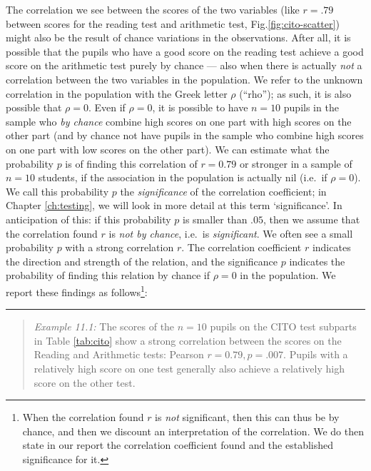 \documentclass[
]{book}
\begin{document}
The correlation we see between the scores of the two variables (like
\(r=.79\) between scores for the reading test and arithmetic test,
Fig.\ref{fig:cito-scatter}) might also be the result of
chance variations in the observations. After all, it is possible that
the pupils who have a good score on the reading test achieve
a good score on the arithmetic test purely by chance --- also when there is
actually \emph{not} a correlation between the two variables in the population. We
refer to the unknown correlation in the population with the Greek letter
\(\rho\) (``rho''); as such, it is also possible that \(\rho=0\). Even if \(\rho=0\),
it is possible to have \(n=10\) pupils in the sample who \emph{by chance} combine
high scores on one part with high scores on the other part (and by chance not
have pupils in the sample who combine high scores on one part with low scores
on the other part). We can estimate what the probability \(p\) is
of finding this correlation of \(r=0.79\) or stronger in a sample of
\(n=10\) students, if the association in the population is actually
nil (i.e.~if \(\rho=0\)). We call this probability \(p\) the
\emph{significance} of the correlation coefficient; in Chapter \ref{ch:testing},
we will look in more detail at this term `significance'.
In anticipation of this: if this probability \(p\) is smaller than
\(.05\), then we assume that the correlation found \(r\) is \emph{not by chance},
i.e.~is \emph{significant}. We often see a small probability \(p\) with a strong
correlation \(r\). The correlation coefficient \(r\) indicates the direction
and strength of the relation, and the significance \(p\) indicates the probability
of finding this relation by chance if \(\rho=0\) in the population. We report
these findings as follows\footnote{When the correlation found \(r\) is \emph{not} significant, then this can thus be by chance,
  and then we discount an interpretation of the correlation. We do then state in our report
  the correlation coefficient found and the established significance for it.}:

\begin{center}\rule{0.5\linewidth}{0.5pt}\end{center}

\begin{quote}
\emph{Example 11.1:}
The scores of the \(n=10\) pupils on the CITO test subparts in
Table \ref{tab:cito} show a strong correlation between the scores
on the Reading and Arithmetic tests: Pearson \(r=0.79, p=.007\). Pupils
with a relatively high score on one test generally also achieve
a relatively high score on the other test.
\end{quote}
\end{document}
